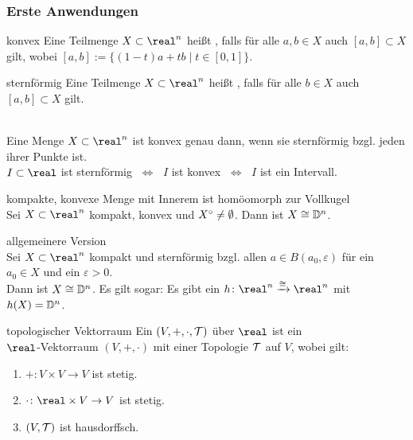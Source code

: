 \pagebreak

\subsubsection{%
    Erste Anwendungen%
}

\begin{Def}{konvex}
    Eine Teilmenge $X \subset \real^n$ heißt , falls
    für alle $a, b \in X$ auch $[a, b] \subset X$ gilt, wobei
    $[a, b] := \{(1 - t)a + tb \;|\; t \in [0, 1]\}$.
\end{Def}

\begin{Def}{sternförmig}
    Eine Teilmenge $X \subset \real^n$ heißt
    ,
    falls für alle $b \in X$ auch $[a, b] \subset X$ gilt.
\end{Def}

\begin{Bem}\\
    Eine Menge $X \subset \real^n$ ist konvex genau dann, wenn sie sternförmig
    bzgl. jeden ihrer Punkte ist. \\
    $I \subset \real$ ist sternförmig $\;\Leftrightarrow\;$
    $I$ ist konvex $\;\Leftrightarrow\;$
    $I$ ist ein Intervall.
\end{Bem}

\begin{Satz}{kompakte, konvexe Menge mit Innerem
             ist homöomorph zur Vollkugel}\\
    Sei $X \subset \real^n$ kompakt, konvex und ${X}^\circ \not= \emptyset$.
    Dann ist $X \cong \mathbb{D}^n$.
\end{Satz}

\begin{Satz}{allgemeinere Version}\\
    Sei $X \subset \real^n$ kompakt und sternförmig bzgl. allen
    $a \in B(a_0, \varepsilon)$ für ein $a_0 \in X$ und ein
    $\varepsilon > 0$. \\
    Dann ist $X \cong \mathbb{D}^n$.
    Es gilt sogar:
    Es gibt ein $h\colon \real^n \homoe \real^n$ mit $h(X) = \mathbb{D}^n$.
\end{Satz}

\linie

\begin{Def}{topologischer Vektorraum}
    Ein  $(V, +, \cdot, \mathcal{T})$ über $\real$ ist
    ein \\
    $\real$-Vektorraum $(V, +, \cdot)$ mit einer Topologie $\mathcal{T}$ auf $V$,
    wobei gilt:
    \begin{enumerate}
        \item
        $+\colon V \times V \rightarrow V$ ist stetig.
        
        \item
        $\cdot\colon \real \times V \rightarrow V$ ist stetig.
        
        \item
        $(V, \mathcal{T})$ ist hausdorffsch.
    \end{enumerate}
\end{Def}


